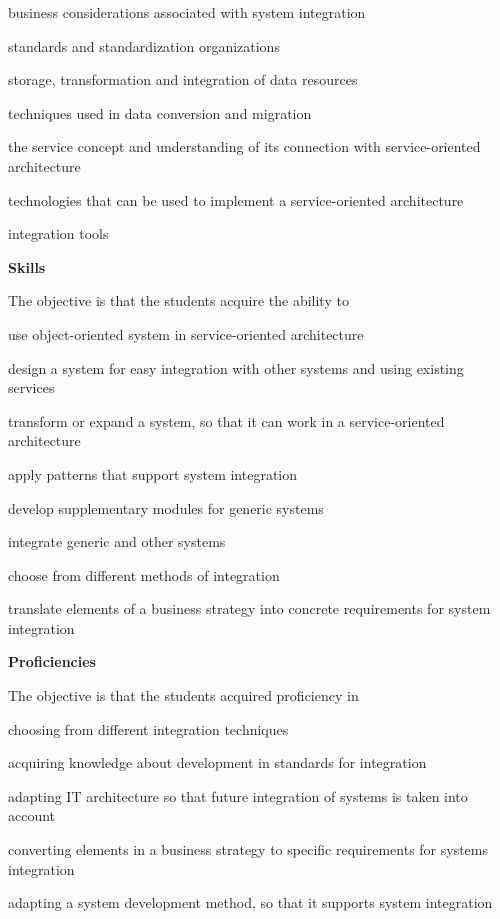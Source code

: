\documentclass[Screen16to9,17pt]{foils}
\begin{document}
\begin{list2}
\item business considerations associated with system integration
\item standards and standardization organizations
\item storage, transformation and integration of data resources
\item techniques used in data conversion and migration
\item the service concept and understanding of its connection with service-oriented architecture
\item technologies that can be used to implement a service-oriented architecture
\item integration tools
\end{list2}


{\bf Skills}

The objective is that the students acquire the ability to

\begin{list2}
\item use object-oriented system in service-oriented architecture
\item design a system for easy integration with other systems and using existing services
\item transform or expand a system, so that it can work in a service-oriented architecture
\item apply patterns that support system integration
\item develop supplementary modules for generic systems
\item integrate generic and other systems
\item choose from different methods of integration
\item translate elements of a business strategy into concrete requirements for system integration
\end{list2}


{\bf Proficiencies}

The objective is that the students acquired proficiency in

\begin{list2}
\item choosing from different integration techniques
\item acquiring knowledge about development in standards for integration
\item adapting IT architecture so that future integration of systems is taken into account
\item converting elements in a business strategy to specific requirements for systems integration
\item adapting a system development method, so that it supports system integration
\end{list2}
\end{document}
